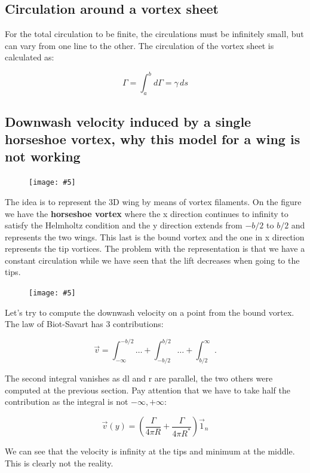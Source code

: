 \documentclass[british,french,11pt, a4paper, openany]{article}
\newcommand{\wrapfig}[6]{%
	\begin{figure}%
		\vspace{-5mm}%
		\texttt{[image: \#5]}%
		\captionof{figure}{}%
		\label{#6}%
	\end{figure}%
}
\begin{document}
\subsection{Circulation around a vortex sheet}
 For the total circulation to be finite, the circulations must be infinitely small, but can vary from one line to the other. The circulation of the vortex sheet is calculated as:

\begin{equation}
\Gamma = \int _a ^b d\Gamma = \gamma \, ds
\end{equation}

\subsection{Downwash velocity induced by a single horseshoe vortex, why this model for a
	wing is not working}

\wrapfig{10}{l}{7}{0.08}{ch3/15}{fig:3.15}
The idea is to represent the 3D wing by means of vortex filaments. On the figure we have the \textbf{horseshoe vortex} where the x direction continues to infinity to satisfy the Helmholtz condition and the y direction extends from $-b/2$ to $b/2$ and represents the two wings. This last is the bound vortex and the one in x direction represents the tip vortices. The problem with the representation is that we have a constant circulation while we have seen that the lift decreases when going to the tips. 

\wrapfig{10}{r}{5}{0.1}{ch3/16}{fig:3.16}
Let's try to compute the downwash velocity on a point from the bound vortex. The law of Biot-Savart has 3 contributions: 

\begin{equation}
\vec{v} = \int _{-\infty} ^{-b/2} \dots + \int _{-b/2} ^{b/2} \dots + \int _{b/2}^{\infty}.
\end{equation}

The second integral vanishes as dl and r are parallel, the two others were computed at the previous section. Pay attention that we have to take half the contribution as the integral is not $-\infty,+\infty$:

\begin{equation}
\vec{v}(y) = \left(\frac{\Gamma}{4\pi R} + \frac{\Gamma}{4\pi R^*} \right) \vec{1}_n
\end{equation}

We can see that the velocity is infinity at the tips and minimum at the middle. This is clearly not the reality.
\end{document}
